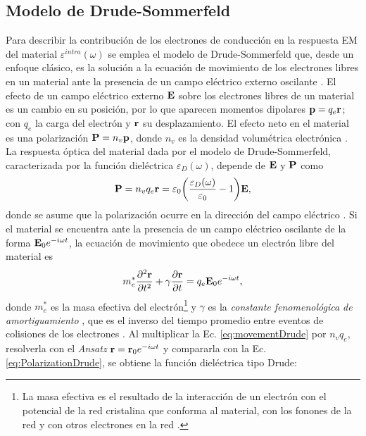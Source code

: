 \subsection{Modelo de Drude-Sommerfeld}

 Para describir la contribución de los electrones de conducción en la respuesta EM del material $\varepsilon^{intra}(\omega)$ se emplea el modelo de Drude-Sommerfeld que, desde un enfoque clásico, es la solución a la ecuación de movimiento de los electrones libres en un material ante la presencia de un campo eléctrico externo oscilante \cite{gross2014festkorperphysik}. El efecto de un campo eléctrico externo $\vb{E}$ sobre los electrones libres de un material es un cambio en su posición, por lo que aparecen momentos dipolares $\vb{p}=q_e\vb{r}$; con $q_e$ la carga del electrón y $\vb{r}$ su desplazamiento.  El efecto neto en el material es una polarización $\vb{P} = n_v \vb{p}$, donde $n_v$ es la densidad volumétrica electrónica \cite{novotny2006principles}.  La respuesta óptica del material dada por el modelo de Drude-Sommerfeld, caracterizada por la función dieléctrica $\varepsilon_D(\omega)$, depende de $\vb{E}$ y $\vb{P}$ como 
%
	\begin{align}
	\vb{P} = n_v q_e \vb{r} =\varepsilon_0\qty(\frac{\varepsilon_D(\omega)}{\varepsilon_0}-1)\vb{E},
	\label{eq:PolarizationDrude}
	\end{align}
%
donde se asume que la polarización ocurre en la dirección del campo eléctrico \cite{novotny2006principles}. Si el material se encuentra ante la presencia de un campo eléctrico oscilante de la forma $\vb{E}_0 e^{-i\omega t}$, la ecuación de movimiento que obedece un electrón libre del material es \cite{kreibig1995clusters,gross2014festkorperphysik}
%
	\begin{align}
	m_e^* \pdv[2]{\vb{r}}{t} +  \gamma \pdv{\vb{r}}{t} = q_e\vb{E}_0e^{-i\omega t},
	\label{eq:movementDrude}
	\end{align}
%
donde $m_e^*$ es la masa efectiva del electrón\footnote{La masa efectiva es el resultado de la interacción de un electrón con el potencial de la red cristalina que conforma al material, con los fonones de la red y con otros electrones en la red \cite{gross2014festkorperphysik}. } \cite{gross2014festkorperphysik} y $\gamma$ es la \emph{constante fenomenológica de amortiguamiento} \cite{kreibig1995clusters}, que es el inverso del tiempo promedio entre eventos de colisiones  de los electrones \cite{novotny2006principles,gross2014festkorperphysik}.  Al multiplicar la Ec.  \eqref{eq:movementDrude} por $n_v q_e$, resolverla con el \emph{Ansatz} $\vb{r} = \vb{r}_0e^{-i\omega t}$ y compararla con la Ec.  \eqref{eq:PolarizationDrude}, se obtiene la función dieléctrica tipo Drude: \cite{novotny2006principles,gross2014festkorperphysik}  \vspace*{-.75em}

